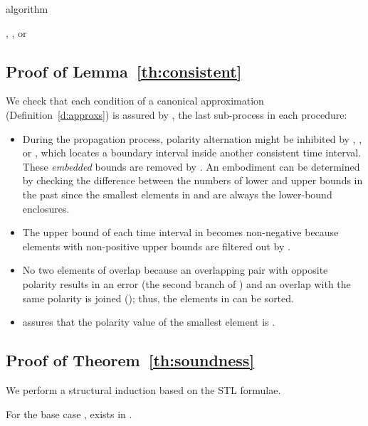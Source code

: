 \documentclass[paper]{ieice}
\begin{document}
\begin{algorithm}[thb]
\caption{\label{a:inittime}  algorithm}

\begin{algorithmic}[1]
  \REQUIRE 
  \ENSURE , , or 

  \IF{}
	\RETURN{}
  \ELSIF{}
	\RETURN{}
\ELSE
    \STATE 
    \IF{}
	  \RETURN{}
    \ELSIF{}
	  \RETURN{}
    \ELSEC{}
	  \RETURN{}
    \ENDIF
  \ENDIF
\end{algorithmic}
\end{algorithm}


\subsection{Proof of Lemma~\ref{th:consistent}}
\label{s:canonical:proof}

We check that each condition of a canonical approximation (Definition~\ref{d:approxs}) is assured by , the last sub-process in each procedure:
\begin{itemize}
\item During the propagation process, polarity alternation might be inhibited by , , or , which locates a boundary interval inside another consistent time interval.
These \emph{embedded} bounds are removed by .
An embodiment can be determined by checking the difference between the numbers of lower and upper bounds in the past since the smallest elements in  and  are always the lower-bound enclosures.
\item The upper bound of each time interval  in  becomes non-negative because elements with non-positive upper bounds are filtered out by .
\item No two elements of  overlap because an overlapping pair with opposite polarity results in an error (the second branch of ) and an overlap with the same polarity is joined ();
thus, the elements in  can be sorted.
\item  assures that the polarity value of the smallest element is .
\Qed
\end{itemize}


\subsection{Proof of Theorem~\ref{th:soundness}}
\label{s:soundness:proof}

We perform a structural induction based on the STL formulae.

For the base case ,  exists in .
\end{document}
